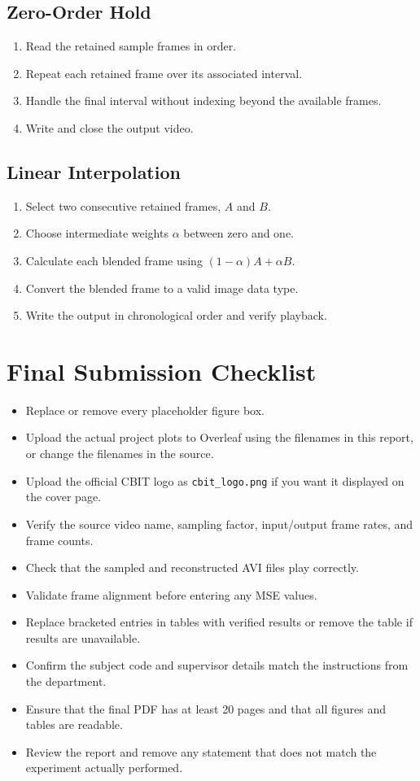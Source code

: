\documentclass[12pt,a4paper,oneside]{report}
\begin{document}
\section*{Zero-Order Hold}
\begin{enumerate}[leftmargin=*]
\item Read the retained sample frames in order.
\item Repeat each retained frame over its associated interval.
\item Handle the final interval without indexing beyond the available frames.
\item Write and close the output video.
\end{enumerate}

\section*{Linear Interpolation}
\begin{enumerate}[leftmargin=*]
\item Select two consecutive retained frames, $A$ and $B$.
\item Choose intermediate weights $\alpha$ between zero and one.
\item Calculate each blended frame using $(1-\alpha)A+\alpha B$.
\item Convert the blended frame to a valid image data type.
\item Write the output in chronological order and verify playback.
\end{enumerate}

\chapter{Final Submission Checklist}
\begin{itemize}[leftmargin=*]
\item Replace or remove every placeholder figure box.
\item Upload the actual project plots to Overleaf using the filenames in this report, or change the filenames in the source.
\item Upload the official CBIT logo as \texttt{cbit\_logo.png} if you want it displayed on the cover page.
\item Verify the source video name, sampling factor, input/output frame rates, and frame counts.
\item Check that the sampled and reconstructed AVI files play correctly.
\item Validate frame alignment before entering any MSE values.
\item Replace bracketed entries in tables with verified results or remove the table if results are unavailable.
\item Confirm the subject code and supervisor details match the instructions from the department.
\item Ensure that the final PDF has at least 20 pages and that all figures and tables are readable.
\item Review the report and remove any statement that does not match the experiment actually performed.
\end{itemize}
\end{document}
